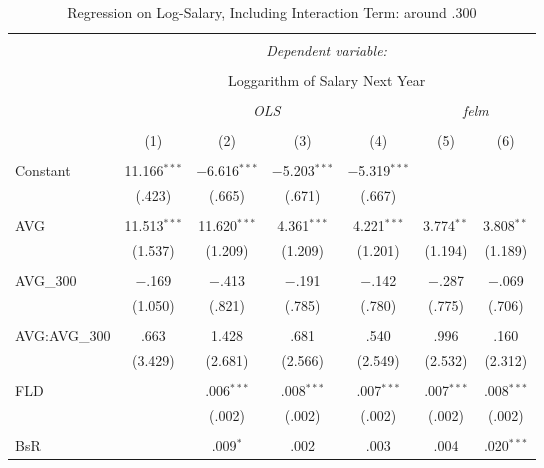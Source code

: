 
\begin{table}[H] \centering
  \caption{Regression on Log-Salary, Including Interaction Term: around .300}
  \label{AVG300_A}
\tiny
\begin{tabular}{@{\extracolsep{5pt}}lcccccc}
\\[-1.8ex]\hline
\hline \\[-1.8ex]
 & \multicolumn{6}{c}{\textit{Dependent variable:}} \\
\cline{2-7}
\\[-1.8ex] & \multicolumn{6}{c}{Loggarithm of Salary Next Year} \\
\\[-1.8ex] & \multicolumn{4}{c}{\textit{OLS}} & \multicolumn{2}{c}{\textit{felm}} \\
\\[-1.8ex] & (1) & (2) & (3) & (4) & (5) & (6)\\
\hline \\[-1.8ex]
 Constant & 11.166$^{***}$ & $-$6.616$^{***}$ & $-$5.203$^{***}$ & $-$5.319$^{***}$ &  &  \\
  & (.423) & (.665) & (.671) & (.667) &  &  \\
  & & & & & & \\
 AVG & 11.513$^{***}$ & 11.620$^{***}$ & 4.361$^{***}$ & 4.221$^{***}$ & 3.774$^{**}$ & 3.808$^{**}$ \\
  & (1.537) & (1.209) & (1.209) & (1.201) & (1.194) & (1.189) \\
  & & & & & & \\
 AVG\_300 & $-$.169 & $-$.413 & $-$.191 & $-$.142 & $-$.287 & $-$.069 \\
  & (1.050) & (.821) & (.785) & (.780) & (.775) & (.706) \\
  & & & & & & \\
  AVG:AVG\_300 & .663 & 1.428 & .681 & .540 & .996 & .160 \\
  & (3.429) & (2.681) & (2.566) & (2.549) & (2.532) & (2.312) \\
  & & & & & & \\
 FLD &  & .006$^{***}$ & .008$^{***}$ & .007$^{***}$ & .007$^{***}$ & .008$^{***}$ \\
  &  & (.002) & (.002) & (.002) & (.002) & (.002) \\
  & & & & & & \\
 BsR &  & .009$^{*}$ & .002 & .003 & .004 & .020$^{***}$ \\

\end{tabular}
\end{table}
